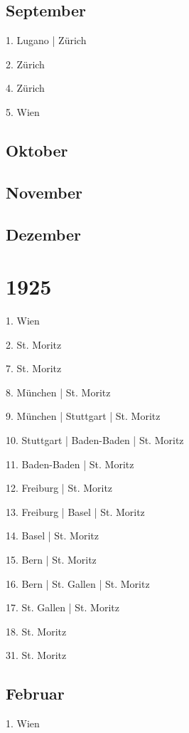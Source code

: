 \documentclass[twoside=false,titlepage=false,open=any, parskip=never, fontsize=10pt, headings=small, chapterprefix=false, appendixprefix=false, DIV=15]{scrbook}
\begin{document}
\begin{multicols}{3}
            \section*{September}
            1. Lugano | Zürich\par
            2. Zürich\par
            4. Zürich\par
            5. Wien\par
            \section*{Oktober}
            \section*{November}
            \section*{Dezember}
            \chapter*{1925}
            1. Wien\par
            2. St. Moritz\par
            7. St. Moritz\par
            8. München | St. Moritz\par
            9. München | Stuttgart | St. Moritz\par
            10. Stuttgart | Baden-Baden | St. Moritz\par
            11. Baden-Baden | St. Moritz\par
            12. Freiburg | St. Moritz\par
            13. Freiburg | Basel | St. Moritz\par
            14. Basel | St. Moritz\par
            15. Bern | St. Moritz\par
            16. Bern | St. Gallen | St. Moritz\par
            17. St. Gallen | St. Moritz\par
            18. St. Moritz\par
            31. St. Moritz\par
            \section*{Februar}
            1. Wien\par

\end{multicols}
\end{document}
